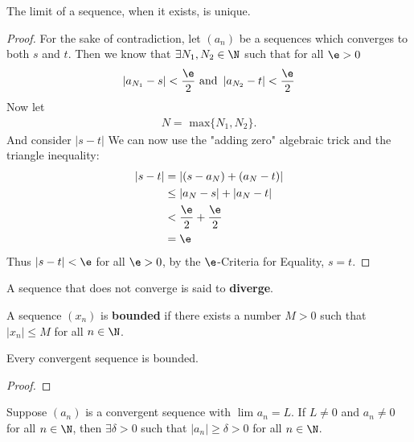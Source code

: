 \begin{theorem}
	The limit of a sequence, when it exists, is unique.
\end{theorem}

\begin{proof}
	For the sake of contradiction, let $\left( a_n \right) $ be a sequences which converges to both $s$ and $t$. Then we know that $\exists N_1, N_2 \in \N$ such that for all $\e > 0$ 
	\begin{align}
		\left|a_{N_{1}} - s\right| < \frac{\e}{2} \text{   and   } \left|a_{N_{2}} - t\right| < \frac{\e}{2}
	\end{align}
	Now let 
	\begin{align}
		N = \text{ max}\{N_{1}, N_{2}\}.
	\end{align}
	And consider $\left|s - t\right|$ We can now use the "adding zero" algebraic trick and the triangle inequality:
	\begin{align}
		\left|s - t\right| &= \left|\left( s - a_N \right) + \left( a_N - t \right) \right| \\
				   &\le  \left|a_N - s\right| + \left|a_N - t\right| \\
				   &< \frac{\e}{2} + \frac{\e}{2} \\
				   &= \e
	\end{align}
	Thus $\left|s - t\right| < \e$ for all $\e > 0$, by the $\e$-Criteria for Equality, $s=t$.
\end{proof}

\begin{definition}
	A sequence that does not converge is said to  \textbf{diverge}.
\end{definition}

\begin{definition}
	A sequence $\left( x_n \right) $ is \textbf{bounded} if there exists a number $M > 0$ such that $\left|x_n\right| \le M$ for all $n \in \N$.
\end{definition}

\begin{theorem}
	Every convergent sequence is bounded.
\end{theorem}

\begin{proof}
\end{proof}

\begin{theorem}
        Suppose $\left( a_n \right) $ is a convergent sequence with $\lim_{} a_n = L$. If $L\neq 0$ and $a_n\neq 0$ for all $n \in \N$, then $\exists \delta > 0$ such that $\left|a_n\right| \ge \delta > 0$ for all $n \in \N$.
\end{theorem}

